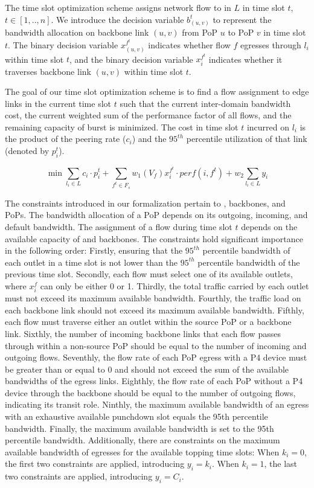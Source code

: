  The time slot optimization scheme assigns network flow to {\egresses} in $L$ in time slot $t$, $t\in[1,..,n]$. We introduce the decision variable $b^t_{(u,v)}$ to represent the bandwidth allocation on backbone link $(u,v)$ from PoP $u$ to PoP $v$ in time slot $t$. The binary decision variable $x_{(u,v)}^{f^{t}}$ indicates whether flow $f$ egresses through {\egress} $l_i$ within time slot $t$, and the binary decision variable $x_i^{f^{t}}$ indicates whether it traverses backbone link $(u,v)$ within time slot $t$.




The goal of our time slot optimization scheme is to find a flow assignment to edge links in the current time slot $t$ such that the current inter-domain bandwidth cost, the current weighted sum of the performance factor of all flows, and the remaining capacity of burst {\egress} is minimized. The cost in time slot $t$ incurred on {\egress} $l_i$ is the product of the peering rate ($c_i$) and the $95^{th}$ percentile utilization of that link (denoted by $p_i^t$). 

$$\min\sum_{l_i \in L} c_i \cdot p_i^t+\sum_{f^t \in F_s} w_1\left(V_f\right) x_i^{f^t}          \cdot perf(i, f^t) +w_2 \sum_{l_i \in L} y_i $$

 The constraints introduced in our formalization pertain to {\egresses}, backbones, and PoPs. The bandwidth allocation of a PoP depends on its outgoing, incoming, and default bandwidth. The assignment of a flow during time slot $t$ depends on the available capacity of {\egresses} and backbones. The constraints hold significant importance in the following order: Firstly, ensuring that the $95^{th}$ percentile bandwidth of each outlet in a time slot is not lower than the $95^{th}$ percentile bandwidth of the previous time slot. Secondly, each flow must select one of its available outlets, where $x_i^f$ can only be either 0 or 1. Thirdly, the total traffic carried by each outlet must not exceed its maximum available bandwidth. Fourthly, the traffic load on each backbone link should not exceed its maximum available bandwidth. Fifthly, each flow must traverse either an outlet within the source PoP or a backbone link. Sixthly, the number of incoming backbone links that each flow passes through within a non-source PoP should be equal to the number of incoming and outgoing flows. Seventhly, the flow rate of each PoP egress with a P4 device must be greater than or equal to 0 and should not exceed the sum of the available bandwidths of the egress links. Eighthly, the flow rate of each PoP without a P4 device through the backbone should be equal to the number of outgoing flows, indicating its transit role. Ninthly, the maximum available bandwidth of an egress with an exhaustive available punchdown slot equals the 95th percentile bandwidth. Finally, the maximum available bandwidth is set to the 95th percentile bandwidth. Additionally, there are constraints on the maximum available bandwidth of egresses for the available topping time slots: When $k_i=0$, the first two constraints are applied, introducing $y_i=k_i$. When $k_i=1$, the last two constraints are applied, introducing $y_i=C_i$.


